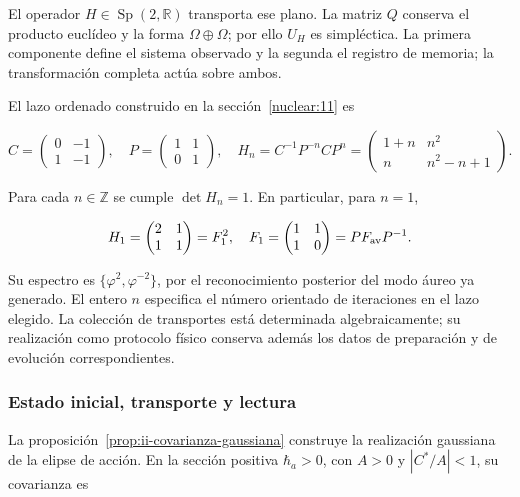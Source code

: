 El operador \(H\in\operatorname{Sp}(2,\mathbb R)\) transporta ese plano. La matriz \(Q\) conserva el producto euclídeo y la forma \(\Omega\oplus\Omega\); por ello \(U_H\) es simpléctica. La primera componente define el sistema observado y la segunda el registro de memoria; la transformación completa actúa sobre ambos.

El lazo ordenado construido en la sección~\ref{nuclear:11} es



\begin{equation}
C=\begin{pmatrix}0&-1\\1&-1\end{pmatrix},\quad
P=\begin{pmatrix}1&1\\0&1\end{pmatrix},\quad
H_n=C^{-1}P^{-n}CP^n
=\begin{pmatrix}1+n&n^2\\n&n^2-n+1\end{pmatrix}.
\label{nuc12:eq:5.2}
\end{equation}



Para cada \(n\in\mathbb Z\) se cumple \(\det H_n=1\). En particular, para \(n=1\),


\begin{equation}
H_1=\begin{pmatrix}2&1\\1&1\end{pmatrix}
=F_1^2,\quad F_1=\begin{pmatrix}1&1\\1&0\end{pmatrix}
=P F_{\rm av}P^{-1}.
\label{nuc12:eq:5.3}
\end{equation}



Su espectro es \(\{\varphi^2,\varphi^{-2}\}\), por el reconocimiento posterior del modo áureo ya generado. El entero \(n\) especifica el número orientado de iteraciones en el lazo elegido. La colección de transportes está determinada algebraicamente; su realización como protocolo físico conserva además los datos de preparación y de evolución correspondientes.

\subsubsection{Estado inicial, transporte y lectura}

La proposición~\ref{prop:ii-covarianza-gaussiana} construye la realización gaussiana de la elipse de acción. En la sección positiva \(\hbar_a>0\), con \(A>0\) y \(|C^*/A|<1\), su covarianza es



